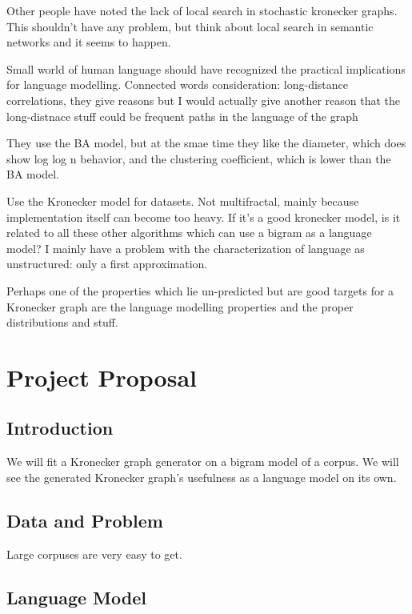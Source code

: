 \documentclass[12pt]{article}
\begin{document}
Other people have noted the lack of local search in stochastic kronecker graphs. This shouldn't have any problem, but think about local search in semantic networks and it seems to happen.

Small world of human language should have recognized the practical implications for language modelling. Connected words consideration: long-distance correlations, they give reasons but I would actually give another reason that the long-distnace stuff could be frequent paths in the language of the graph

They use the BA model, but at the smae time they like the diameter, which does show log log n behavior, and the clustering coefficient, which is lower than the BA model.


Use the Kronecker model for datasets. Not multifractal, mainly because implementation itself can become too heavy. If it's a good kronecker model, is it related to all these other algorithms which can use a bigram as a language model? I mainly have a problem with the characterization of language as unstructured: only a first approximation.

Perhaps one of the properties which lie un-predicted but are good targets for a Kronecker graph are the language modelling properties and the proper distributions and stuff.

\section{Project Proposal}

\subsection{Introduction}
We will fit a Kronecker graph generator on a bigram model of a corpus. We will see the generated Kronecker graph's usefulness as a language model on its own.
\subsection{Data and Problem}
Large corpuses are very easy to get. %
\subsection{Language Model}
\end{document}
